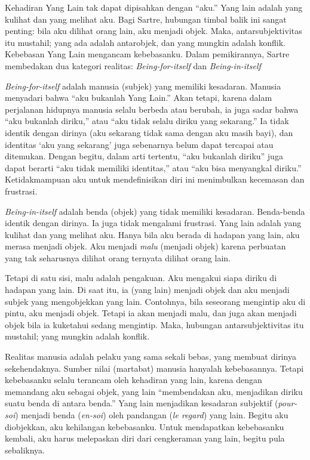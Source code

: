 \documentclass[10pt,a4paper]{article}
\begin{document}
\begin{multicols}{2}
Kehadiran Yang Lain tak dapat dipisahkan dengan ``aku.'' Yang lain
adalah yang kulihat dan yang melihat aku. Bagi Sartre, hubungan timbal
balik ini sangat penting: bila aku dilihat orang lain, aku menjadi
objek. Maka, antarsubjektivitas itu mustahil; yang ada adalah
antarobjek, dan yang mungkin adalah konflik. Kebebasan Yang Lain
mengancam kebebasanku. Dalam pemikirannya, Sartre membedakan dua
kategori realitas: \emph{Being-for-itself} dan \emph{Being-in-itself}

\emph{Being-for-itself} adalah manusia (subjek) yang memiliki kesadaran.
Manusia menyadari bahwa ``aku bukanlah Yang Lain.'' Akan tetapi, karena
dalam perjalanan hidupnya manusia selalu berbeda atau berubah, ia juga
sadar bahwa ``aku bukanlah diriku,'' atau ``aku tidak selalu diriku yang
sekarang.'' Ia tidak identik dengan dirinya (aku sekarang tidak sama
dengan aku masih bayi), dan identitas `aku yang sekarang' juga
sebenarnya belum dapat tercapai atau ditemukan. Dengan begitu, dalam
arti tertentu, ``aku bukanlah diriku'' juga dapat berarti ``aku tidak
memiliki identitas,'' atau ``aku bisa menyangkal diriku.''
Ketidakmampuan aku untuk mendefinisikan diri ini menimbulkan kecemasan
dan frustrasi.

\emph{Being-in-itself} adalah benda (objek) yang tidak memiliki
kesadaran. Benda-benda identik dengan dirinya. Ia juga tidak mengalami
frustrasi. Yang lain adalah yang kulihat dan yang melihat aku. Hanya
bila aku berada di hadapan yang lain, aku merasa menjadi objek. Aku
menjadi \emph{malu} (menjadi objek) karena perbuatan yang tak seharusnya
dilihat orang ternyata dilihat orang lain.

Tetapi di satu sisi, malu adalah pengakuan. Aku mengakui siapa diriku di
hadapan yang lain. Di saat itu, ia (yang lain) menjadi objek dan aku
menjadi subjek yang mengobjekkan yang lain. Contohnya, bila seseorang
mengintip aku di pintu, aku menjadi objek. Tetapi ia akan menjadi malu,
dan juga akan menjadi objek bila ia kuketahui sedang mengintip. Maka,
hubungan antarsubjektivitas itu mustahil; yang mungkin adalah konflik.

Realitas manusia adalah pelaku yang sama sekali bebas, yang membuat
dirinya sekehendaknya. Sumber nilai (martabat) manusia hanyalah
kebebasannya. Tetapi kebebasanku selalu terancam oleh kehadiran yang
lain, karena dengan memandang aku sebagai objek, yang lain ``membendakan
aku, menjadikan diriku suatu benda di antara benda.'' Yang lain
menjadikan kesadaran subjektif (\emph{pour-soi}) menjadi benda
(\emph{en-soi}) oleh pandangan (\emph{le regard}) yang lain. Begitu aku
diobjekkan, aku kehilangan kebebasanku. Untuk mendapatkan kebebasanku
kembali, aku harus melepaskan diri dari cengkeraman yang lain, begitu
pula sebaliknya.


\end{multicols}
\end{document}
